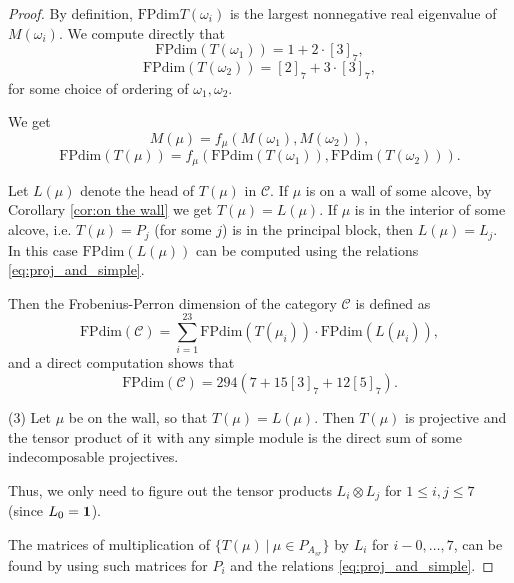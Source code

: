 \documentclass{amsart}
\theoremstyle{definition}
\newcommand{\C}{\mathcal{C}}
\newcommand{\FP}{\text{FPdim}}
\newcommand{\be}{{\bf 1}}
\numberwithin{equation}{section}
\begin{document}
\begin{proof}
         By definition, $\FP T(\omega_i)$ is the largest nonnegative real eigenvalue of $M(\omega_i)$. We compute directly that 
         $$
         \FP (T(\omega_1)) = 1+2\cdot [3]_7,
         $$
         $$
         \FP (T(\omega_2)) = [2]_7+3\cdot [3]_7,
         $$
         for some choice of ordering of $\omega_1,\omega_2$.
         
         We get
         $$M(\mu)=f_\mu(M(\omega_1), M(\omega_2)),$$
         $$
         \FP(T(\mu)) = f_\mu(\FP (T(\omega_1)), \FP (T(\omega_2))).
         $$

         Let $L(\mu)$ denote the head of $T(\mu)$ in $\C$. If $\mu$ is on a wall of some alcove, by Corollary \ref{cor:on the  wall} we get $T(\mu)=L(\mu)$. If $\mu$ is in the interior of some alcove, i.e. $T(\mu) = P_j$ (for some $j$) is in the principal block, then $L(\mu)=L_j$. In this case $\FP(L(\mu))$ can be computed using the relations \ref{eq:proj_and_simple}.
         
         Then the Frobenius-Perron dimension of the category $\C$ is defined as
         $$
         \FP(\C) = \sum_{i=1}^{23} \FP(T(\mu_i))\cdot \FP(L(\mu_i)),
         $$
         and a direct computation shows that 
         $$
         \FP(\C) = 294(7+15[3]_7+12[5]_7).
         $$
         
(3) Let $\mu$ be on the wall, so that $T(\mu)=L(\mu)$. Then $T(\mu)$ is projective and the tensor product of it with any simple module is the direct sum of some indecomposable projectives.

    Thus, we only need to figure out the tensor products $L_i\otimes L_j$ for $1\le i,j \le 7$ (since $L_0=\be$).

    The matrices of multiplication of $\{T(\mu)~|~\mu\in P_{A_{sr}}\}$ by $L_i$ for $i-0,\ldots, 7$, can be found by using such matrices for $P_i$ and the relations \ref{eq:proj_and_simple}.


\end{proof}
\end{document}
